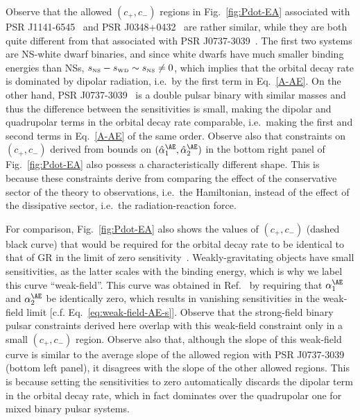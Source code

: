\documentclass[prd,aps,twocolumn,nofootinbib,showpacs,superscriptaddress]{revtex4-1}
\newcommand{\WD}{{\mbox{\tiny WD}}}
\newcommand{\NSS}{{\mbox{\tiny NS}}}
\begin{document}
Observe that the allowed $(c_{+},c_{-})$ regions in Fig.~\ref{fig:Pdot-EA} associated with PSR J1141-6545~\cite{bhat} and PSR J0348+0432~\cite{2.01NS} are rather similar, while they are both quite different from that associated with PSR J0737-3039~\cite{2.01NS}. The first two systems are NS-white dwarf binaries, 
and since white dwarfs have much smaller binding energies than NSs, $s_{\NSS} - s_{\WD} \sim s_{\NSS} \neq 0$, which implies that the orbital decay rate is dominated by dipolar radiation, i.e.~by the first term in Eq.~\eqref{A-AE}. On the other hand, PSR J0737-3039~\cite{kramer-double-pulsar} is a double pulsar binary with similar masses and thus the difference between the sensitivities is small, making the dipolar and quadrupolar terms in the orbital decay rate comparable, i.e.~making the first and second terms in Eq.~\eqref{A-AE} of the same order. Observe also that constraints on $(c_{+},c_{-})$ derived from bounds on $(\hat{\alpha}_{1}^{\AE},\hat{\alpha}_{2}^{\AE})$ in the bottom right panel of Fig.~\ref{fig:Pdot-EA} also possess a characteristically different shape. This is because these constraints derive from comparing the effect of the conservative sector of the theory to observations, i.e.~the Hamiltonian, instead of the effect of the dissipative sector, i.e.~the radiation-reaction force.

For comparison, Fig.~\ref{fig:Pdot-EA} also shows the values of $(c_{+},c_{-})$ (dashed black curve) that would be required for the orbital decay rate to be identical to that of GR in the limit of zero sensitivity~\cite{Foster:2006az}.
Weakly-gravitating objects have small sensitivities, as the latter scales with the binding energy, which is why we label this curve ``weak-field''. This curve was obtained in Ref.~\cite{Foster:2006az} by requiring that $\alpha_{1}^{\AE}$ and $\alpha_{2}^{\AE}$ be identically zero, which results in vanishing sensitivities in the weak-field limit [c.f. Eq.~\eqref{eq:weak-field-AE-s}]. Observe that the strong-field binary pulsar constraints derived here overlap with this weak-field constraint only in a small $(c_{+},c_{-})$ region. Observe also that, although the slope of this weak-field curve is similar to the average slope of the allowed region with PSR J0737-3039~\cite{kramer-double-pulsar} (bottom left panel), it disagrees with the slope of the other allowed regions. This is because setting the sensitivities to zero automatically discards the dipolar term in the orbital decay rate, which in fact dominates over the quadrupolar one for mixed binary pulsar systems.
\end{document}
